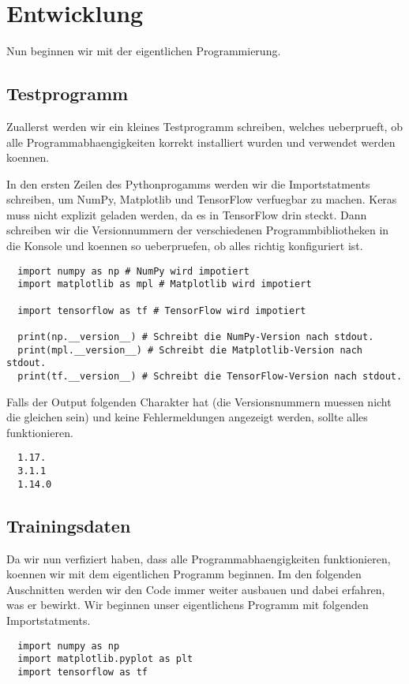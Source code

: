 \section{Entwicklung}
Nun beginnen wir mit der eigentlichen Programmierung.

\subsection{Testprogramm}
Zuallerst werden wir ein kleines Testprogramm schreiben, welches ueberprueft, ob
alle Programmabhaengigkeiten korrekt installiert wurden und verwendet werden koennen.

In den ersten Zeilen des Pythonprogamms werden wir die Importstatments
schreiben, um NumPy, Matplotlib und TensorFlow verfuegbar zu machen.
Keras muss nicht explizit geladen werden, da es in TensorFlow drin steckt.
Dann schreiben wir die Versionnummern der verschiedenen Programmbibliotheken
in die Konsole und koennen so ueberpruefen, ob alles richtig konfiguriert ist.
\begin{verbatim}
  import numpy as np # NumPy wird impotiert
  import matplotlib as mpl # Matplotlib wird impotiert

  import tensorflow as tf # TensorFlow wird impotiert

  print(np.__version__) # Schreibt die NumPy-Version nach stdout.
  print(mpl.__version__) # Schreibt die Matplotlib-Version nach stdout.
  print(tf.__version__) # Schreibt die TensorFlow-Version nach stdout.
\end{verbatim}
Falls der Output folgenden Charakter hat (die Versionsnummern muessen nicht
die gleichen sein) und keine Fehlermeldungen angezeigt
werden, sollte alles funktionieren.
\begin{verbatim}
  1.17.
  3.1.1
  1.14.0
\end{verbatim}
\para{}

\subsection{Trainingsdaten}
Da wir nun verfiziert haben, dass alle Programmabhaengigkeiten funktionieren,
koennen wir mit dem eigentlichen Programm beginnen.
\para{}
Im den folgenden Auschnitten werden wir den Code immer weiter ausbauen und dabei
erfahren, was er bewirkt. Wir beginnen unser eigentlichens Programm mit folgenden Importstatments.
\begin{verbatim}
  import numpy as np
  import matplotlib.pyplot as plt
  import tensorflow as tf
\end{verbatim}

